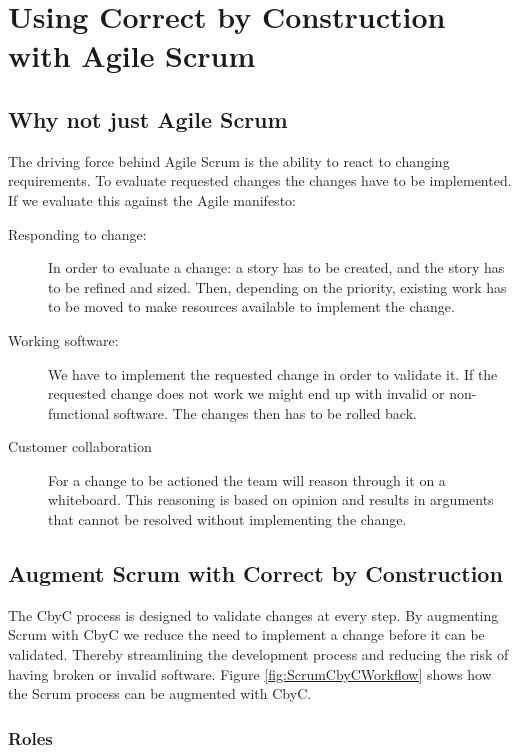 
\chapter{Using Correct by Construction with Agile Scrum} %

\label{CbyCWithAgileScrum} %

\section{Why not just Agile Scrum}

The driving force behind Agile Scrum is the ability to react to changing requirements.
To evaluate requested changes the changes have to be implemented. 
If we evaluate this against the Agile manifesto:
\begin{description}
	\item [Responding to change:]  In order to evaluate a change: a story has to be
		created, and the story has to be refined and sized. Then, depending on the 
		priority, existing work has to be moved to make resources available to implement
		the change. 
	\item [Working software:] We have to implement the requested change in order to
		validate it. If the requested change does not work we might end up with invalid or
		non-functional software. The changes then has to be rolled back.
	\item [Customer collaboration] For a change to be actioned the team will reason
		through it on a whiteboard. This reasoning is based on opinion and results in
		arguments that cannot be resolved without implementing the change.
\end{description}

\section{Augment Scrum with Correct by Construction}

The CbyC process is designed to validate changes at every step. By augmenting
Scrum with CbyC we reduce the need to implement a change before it can be validated.
Thereby streamlining the development process and reducing the risk of having broken or invalid software.
Figure \ref{fig:ScrumCbyCWorkflow} shows how the Scrum process can be augmented with CbyC.

\subsection{Roles}

